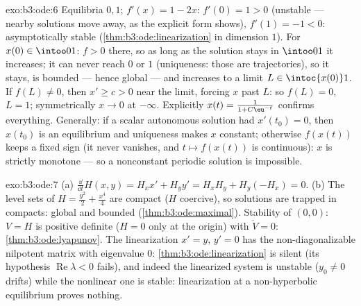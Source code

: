 \begin{solution}{exo:b3:ode:6}
Equilibria $0, 1$; $f'(x) = 1 - 2x$: $f'(0) = 1 > 0$
(unstable --- nearby solutions move away, as the explicit
form shows), $f'(1) = -1 < 0$: asymptotically stable
(\cref{thm:b3:ode:linearization} in dimension $1$). For
$x(0) \in \intoo01$: $f > 0$ there, so as long as the
solution stays in $\intoo01$ it increases; it can never reach
$0$ or $1$ (uniqueness: those are trajectories), so it stays,
is bounded --- hence global --- and increases to a limit $L
\in \intoc{x(0)}1$. If $f(L) \neq 0$, then $x' \geq c > 0$
near the limit, forcing $x$ past $L$: so $f(L) = 0$, $L = 1$;
symmetrically $x \to 0$ at $-\infty$. Explicitly $x(t) =
\frac1{1 + C\eu^{-t}}$ confirms everything. Generally: if a
scalar autonomous solution had $x'(t_0) = 0$, then $x(t_0)$
is an equilibrium and uniqueness makes $x$ constant;
otherwise $f(x(t))$ keeps a fixed sign (it never vanishes,
and $t \mapsto f(x(t))$ is continuous): $x$ is strictly
monotone --- so a nonconstant periodic solution is
impossible.
\end{solution}

\begin{solution}{exo:b3:ode:7}
(a) $\frac{\dd}{\dd t}H(x,y) = H_xx' + H_yy' = H_xH_y +
H_y(-H_x) = 0$.
(b) The level sets of $H = \frac{y^2}2 + \frac{x^4}4$ are
compact ($H$ coercive), so solutions are trapped in compacts:
global and bounded (\cref{thm:b3:ode:maximal}). Stability of
$(0,0)$: $V = H$ is positive definite ($H = 0$ only at the
origin) with $\dot V = 0$: \cref{thm:b3:ode:lyapunov}. The
linearization $x' = y$, $y' = 0$ has the non-diagonalizable
nilpotent matrix with eigenvalue $0$:
\cref{thm:b3:ode:linearization} is silent (its hypothesis
$\operatorname{Re}\lambda < 0$ fails), and indeed the
linearized system is unstable ($y_0 \ne 0$ drifts) while the
nonlinear one is stable: linearization at a non-hyperbolic
equilibrium proves nothing.
\end{solution}

